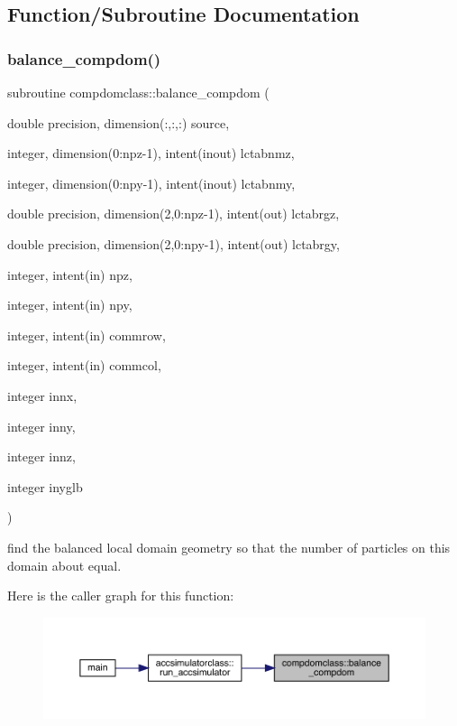 \subsection{Function/\+Subroutine Documentation}
\mbox{\label{namespacecompdomclass_a024b1cbd7d29d1bd2ac4285c45b25cb1}} 
\subsubsection{\texorpdfstring{balance\_compdom()}{balance\_compdom()}}
{\footnotesize\ttfamily subroutine compdomclass\+::balance\+\_\+compdom (\begin{DoxyParamCaption}\item[{double precision, dimension(\+:,\+:,\+:)}]{source,  }\item[{integer, dimension(0\+:npz-\/1), intent(inout)}]{lctabnmz,  }\item[{integer, dimension(0\+:npy-\/1), intent(inout)}]{lctabnmy,  }\item[{double precision, dimension(2,0\+:npz-\/1), intent(out)}]{lctabrgz,  }\item[{double precision, dimension(2,0\+:npy-\/1), intent(out)}]{lctabrgy,  }\item[{integer, intent(in)}]{npz,  }\item[{integer, intent(in)}]{npy,  }\item[{integer, intent(in)}]{commrow,  }\item[{integer, intent(in)}]{commcol,  }\item[{integer}]{innx,  }\item[{integer}]{inny,  }\item[{integer}]{innz,  }\item[{integer}]{inyglb }\end{DoxyParamCaption})}



find the balanced local domain geometry so that the number of particles on this domain about equal. 

Here is the caller graph for this function\+:\nopagebreak
\begin{figure}[H]
\begin{center}
\leavevmode
\includegraphics[width=350pt]{namespacecompdomclass_a024b1cbd7d29d1bd2ac4285c45b25cb1_icgraph}
\end{center}
\end{figure}
\mbox{\label{namespacecompdomclass_ae220a1544909bd8851faed61ce9ad7b8}} 
